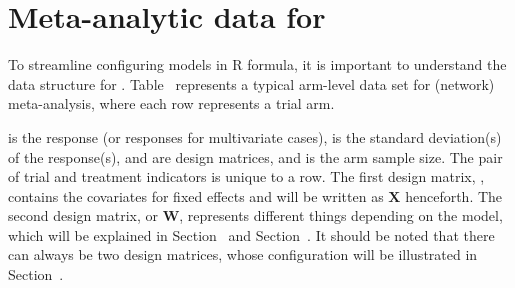 \section{Meta-analytic data for }\label{sec:data-description}
To streamline configuring models in R formula, it is important to understand the data structure for . Table~ represents a typical {\color{black}arm-level data set for (network) meta-analysis, where each row represents a trial arm.} 
\begin{table}[H]
    \centering
  \caption{An example of arm-level meta-analytic data. {\color{black} \textbf{Trial} is equivalent to Study ID. A meta-analysis has two treatments in each trial for all trials, whereas a network meta-analysis can have trials with different numbers of treatments across trials. This distinction determines the number of rows for each trial (i.e. strictly two rows per trial in meta-analyses and a differing number of rows per trial for network meta-analyses). , , , and  can each be a vector, in which case the row vector representation indicates distributing across columns. For example, if  consists of two endpoints, $(Y_1, Y_2)$, then each $\bm{y}_{kt}^\top$ should enter a row as two columns,  and .}}
  \label{tab:data-structure}
\end{table}
 is the response (or responses for multivariate cases),  is the standard deviation(s) of the response(s),  and  are design matrices, and  is the arm sample size. The pair of trial and treatment indicators is unique to a row. {\color{black}The first design matrix, , contains the covariates for fixed effects and will be written as $\bm{X}$ henceforth. The second design matrix,  or $\bm{W}$, represents different things depending on the model, which will be explained in Section~ and Section~. It should be noted that there can always be two design matrices, whose configuration will be illustrated in Section~.}


